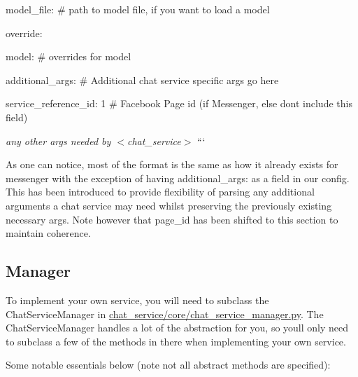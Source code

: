 \begin{DoxyItemize}
\begin{DoxyItemize}
\item model\+\_\+file\+: \# path to model file, if you want to load a model
\item override\+:
\begin{DoxyItemize}
\item model\+: \# overrides for model
\end{DoxyItemize}
\end{DoxyItemize}
\item additional\+\_\+args\+: \# Additional chat service specific args go here
\begin{DoxyItemize}
\item service\+\_\+reference\+\_\+id\+: 1 \# Facebook Page id (if Messenger, else don\textquotesingle{}t include this field)
\item {\itshape any other args needed by $<$chat\+\_\+service$>$} ```
\end{DoxyItemize}
\end{DoxyItemize}

As one can notice, most of the format is the same as how it already exists for messenger with the exception of having {\ttfamily additional\+\_\+args\+:} as a field in our config. This has been introduced to provide flexibility of parsing any additional arguments a chat service may need whilst preserving the previously existing necessary args. Note however that {\ttfamily page\+\_\+id} has been shifted to this section to maintain coherence.

\subsection*{Manager}

To implement your own service, you will need to subclass the {\ttfamily Chat\+Service\+Manager} in {\ttfamily \hyperlink{chat__service__manager_8py}{chat\+\_\+service/core/chat\+\_\+service\+\_\+manager.\+py}}. The {\ttfamily Chat\+Service\+Manager} handles a lot of the abstraction for you, so you\textquotesingle{}ll only need to subclass a few of the methods in there when implementing your own service.

Some notable essentials below (note not all abstract methods are specified)\+:


